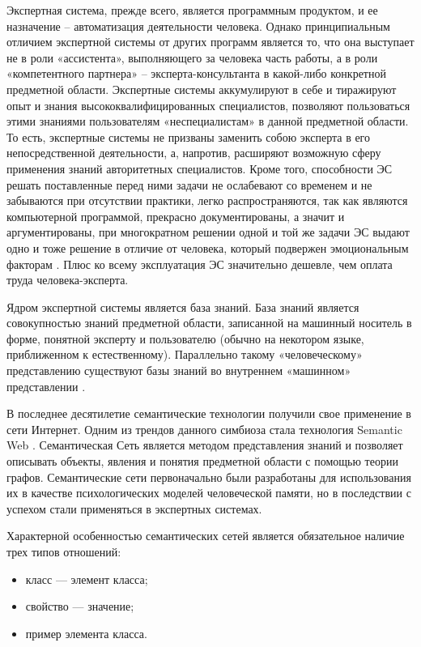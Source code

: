 Экспертная система, прежде всего, является программным продуктом, и ее назначение – автоматизация деятельности человека. Однако принципиальным отличием экспертной системы  от других программ является то, что она выступает не в роли «ассистента», выполняющего за человека часть работы, а в роли «компетентного партнера» – эксперта-консультанта в какой-либо конкретной предметной области. Экспертные системы аккумулируют в себе и тиражируют опыт и знания высококвалифицированных специалистов, позволяют пользоваться этими знаниями пользователям «неспециалистам» в данной предметной области. То есть, экспертные системы не призваны заменить собою эксперта в его непосредственной деятельности, а, напротив, расширяют возможную сферу применения знаний авторитетных специалистов. Кроме того, способности ЭС решать поставленные перед ними задачи не ослабевают со временем и не забываются при отсутствии практики, легко распространяются, так как являются компьютерной программой, прекрасно документированы, а значит и аргументированы, при многократном решении одной и той же задачи ЭС выдают одно и тоже решение в отличие от человека, который подвержен эмоциональным факторам \cite{mur2005intro}. Плюс ко всему эксплуатация ЭС значительно дешевле, чем оплата труда человека-эксперта. 

Ядром экспертной системы является база знаний. База знаний является совокупностью  знаний предметной области, записанной на машинный носитель в форме, понятной эксперту и пользователю (обычно на некотором языке, приближенном к естественному). Параллельно такому «человеческому» представлению существуют базы знаний во внутреннем «машинном» представлении \cite{gavrilova2000db}.

В последнее десятилетие семантические технологии получили свое применение в сети Интернет. Одним из трендов данного симбиоза стала технология Semantic Web \cite{shadbolt2006semantic}. Семантическая Сеть является  методом представления знаний и позволяет описывать объекты, явления и понятия предметной области с помощью теории графов. Семантические сети первоначально были разработаны для использования их в качестве психологических моделей человеческой памяти, но в последствии с успехом стали применяться в экспертных системах. 

Характерной особенностью семантических сетей является обязательное наличие трех типов отношений:

\begin{itemize}
\item класс — элемент класса;
\item свойство — значение; 
\item пример элемента класса.
\end{itemize}

